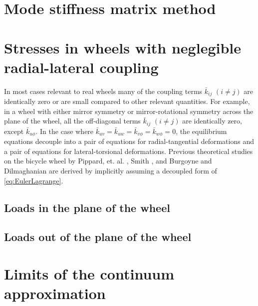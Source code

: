 \documentclass[\rootdir/thesis.tex]{subfiles}
\begin{document}
\section{Mode stiffness matrix method}
\label{sec:ModeMatrix}



\section{Stresses in wheels with neglegible radial-lateral coupling}
In most cases relevant to real wheels many of the coupling terms $\bar{k}_{ij}$ $(i \neq j)$ are identically zero or are small compared to other relevant quantities. For example, in a wheel with either mirror symmetry or mirror-rotational symmetry across the plane of the wheel, all the off-diagonal terms $\bar{k}_{ij}$ $(i \neq j)$ are identically zero, except $\bar{k}_{u\phi}$. In the case where $\bar{k}_{uv}=\bar{k}_{uw}=\bar{k}_{v\phi}=\bar{k}_{w\phi}=0$, the equilibrium equations decouple into a pair of equations for radial-tangential deformations and a pair of equations for lateral-torsional deformations. Previous theoretical studies on the bicycle wheel by Pippard, et. al. \cite{Pippard1931,Pippard1932a,Pippard1932b}, Smith \cite{Smith1901}, and Burgoyne and Dilmaghanian \cite{Burgoyne1993} are derived by implicitly assuming a decoupled form of \eqref{eq:EulerLagrange}.

\subsection{Loads in the plane of the wheel}
\label{sec:RadTan}


\subsection{Loads out of the plane of the wheel}
\label{sec:Lateral}


\section{Limits of the continuum approximation}
\end{document}
